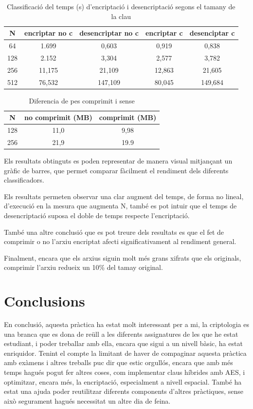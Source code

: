 \documentclass{ieeetj}
\begin{document}
\begin{table}[H]
\centering
\caption{Classificació del temps (s) d'encriptació i desencriptació segons el tamany de la clau}
\label{tab:clasificacion}
\begin{tabular}{|c|c|c|c|c|}
\hline
\textbf{N} & \textbf{encriptar no c} & \textbf{desencriptar no c} & \textbf{encriptar c} & {desenciptar c} \\
\hline
64   & 1.699 & 0,603 & 0,919 & 0,838 \\
128  & 2.152 & 3,304 & 2,577 & 3,782 \\
256  & 11,175 & 21,109 & 12,863 & 21,605 \\
512  & 76,532 & 147,109 & 80,045 & 149,684 \\
\hline
\end{tabular}
\end{table}

\begin{table}[H]
\centering
\caption{Diferencia de pes comprimit i sense}
\label{tab:clasificacion}
\begin{tabular}{|c|c|c|}
\hline
\textbf{N} & \textbf{no comprimit (MB)} & \textbf{comprimit (MB)} \\
\hline
128  & 11,0 & 9,98 \\
256  & 21,9 & 19.9 \\
\hline
\end{tabular}
\end{table}

Els resultats obtinguts es poden representar de manera visual mitjançant un gràfic de barres, que permet comparar fàcilment el rendiment dels diferents classificadors.

Els resultats permeten observar una clar augment del temps, de forma no lineal, d'execució en la mesura que augmenta N, també es pot intuir que el temps de desencriptació suposa el doble de temps respecte l'encriptació.

També una altre conclusió que es pot treure dels resultats es que el fet de comprimir o no l'arxiu encriptat afecti significativament al rendiment general.

Finalment, encara que els arxius siguin molt més grans xifrats que els originals, comprimir l'arxiu redueix un 10\% del tamay original.

\section{Conclusions} 
En conclusió, aquesta pràctica ha estat molt interessant per a mi, la criptologia es una branca que es dona de reüll a les diferents assignatures de les que he estat estudiant, i poder treballar amb ella, encara que sigui a un nivell bàsic, ha estat enriquidor.
Tenint el compte la limitant de haver de compaginar aquesta pràctica amb exàmens i altres treballs puc dir que estic orgullós, encara que amb més temps hagués pogut fer altres coses, com implementar claus híbrides amb AES, i optimitzar, encara més, la encriptació, especialment a nivell espacial.
També ha estat una ajuda poder reutilitzar diferents components d'altres pràctiques, sense això segurament hagués necessitat un altre dia de feina.
\end{document}
